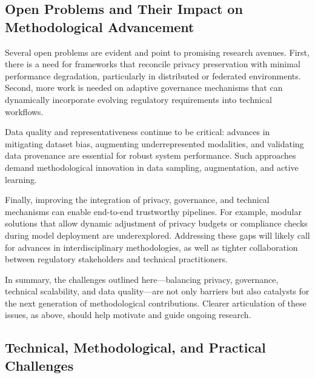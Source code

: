 \documentclass[sigconf]{acmart}
\begin{document}
\subsection{Open Problems and Their Impact on Methodological Advancement}

Several open problems are evident and point to promising research avenues. First, there is a need for frameworks that reconcile privacy preservation with minimal performance degradation, particularly in distributed or federated environments. Second, more work is needed on adaptive governance mechanisms that can dynamically incorporate evolving regulatory requirements into technical workflows.

Data quality and representativeness continue to be critical: advances in mitigating dataset bias, augmenting underrepresented modalities, and validating data provenance are essential for robust system performance. Such approaches demand methodological innovation in data sampling, augmentation, and active learning.

Finally, improving the integration of privacy, governance, and technical mechanisms can enable end-to-end trustworthy pipelines. For example, modular solutions that allow dynamic adjustment of privacy budgets or compliance checks during model deployment are underexplored. Addressing these gaps will likely call for advances in interdisciplinary methodologies, as well as tighter collaboration between regulatory stakeholders and technical practitioners.

In summary, the challenges outlined here—balancing privacy, governance, technical scalability, and data quality—are not only barriers but also catalysts for the next generation of methodological contributions. Clearer articulation of these issues, as above, should help motivate and guide ongoing research.

\subsection{Technical, Methodological, and Practical Challenges}
\end{document}
